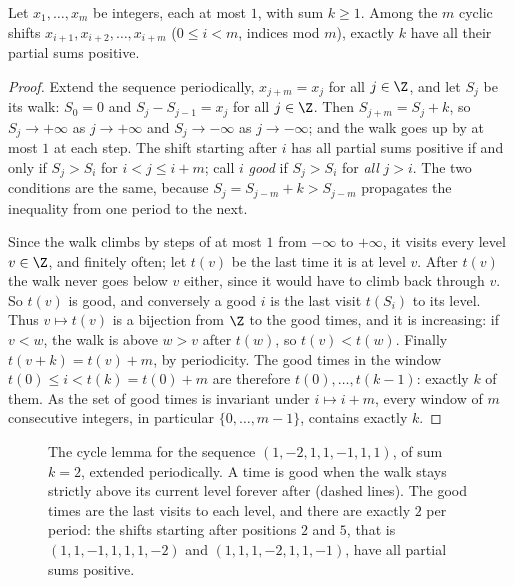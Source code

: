 \begin{theorem}\label{thm:cyclelemma}
Let $x_1,\dots,x_m$ be integers, each at most $1$, with sum $k\ge1$. Among the $m$ cyclic shifts $x_{i+1},x_{i+2},\dots,x_{i+m}$ ($0\le i<m$, indices mod $m$),
exactly $k$ have all their partial sums positive.
\end{theorem}
\begin{proof}
Extend the sequence periodically, $x_{j+m}=x_j$ for all $j\in\Z$, and let $S_j$ be its walk: $S_0=0$ and $S_j-S_{j-1}=x_j$ for all $j\in\Z$. Then
$S_{j+m}=S_j+k$, so $S_j\to+\infty$ as $j\to+\infty$ and $S_j\to-\infty$ as $j\to-\infty$; and the walk goes up by at most $1$ at each step. The shift starting
after $i$ has all partial sums positive if and only if $S_j>S_i$ for $i<j\le i+m$; call $i$ \emph{good} if $S_j>S_i$ for \emph{all} $j>i$. The two conditions
are the same, because $S_j=S_{j-m}+k>S_{j-m}$ propagates the inequality from one period to the next.

Since the walk climbs by steps of at most $1$ from $-\infty$ to $+\infty$, it visits every level $v\in\Z$, and finitely often; let $t(v)$ be the last
time it is at level $v$. After $t(v)$ the walk never goes below $v$ either, since it would have to climb back through $v$. So $t(v)$ is
good, and conversely a good $i$ is the last visit $t(S_i)$ to its level. Thus $v\mapsto t(v)$ is a bijection from $\Z$ to the good times, and
it is increasing: if $v<w$, the walk is above $w>v$ after $t(w)$, so $t(v)<t(w)$. Finally $t(v+k)=t(v)+m$, by periodicity. The good
times in the window $t(0)\le i<t(k)=t(0)+m$ are therefore $t(0),\dots,t(k-1)$: exactly $k$ of them. As the set of good times is invariant
under $i\mapsto i+m$, every window of $m$ consecutive integers, in particular $\{0,\dots,m-1\}$, contains exactly $k$.
\end{proof}

\begin{figure}[ht]
\centering
{}
\caption{The cycle lemma for the sequence $(1,-2,1,1,-1,1,1)$, of sum $k=2$, extended periodically. A time is good when the
walk stays strictly above its current level forever after (dashed lines). The good times are the last visits to each
level, and there are exactly $2$ per period: the shifts starting after positions $2$ and $5$, that is $(1,1,-1,1,1,1,-2)$ and
$(1,1,1,-2,1,1,-1)$, have all partial sums positive.}
\label{fig:cyclelemma}
\end{figure}

